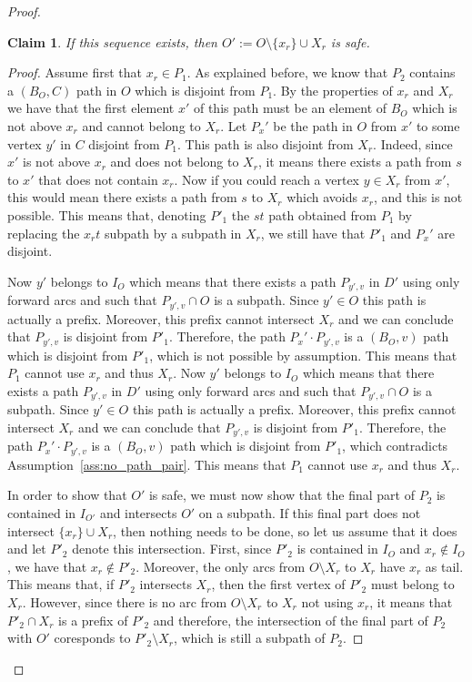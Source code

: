 \documentclass[utf8,11pt]{article}
\theoremstyle{plain}
\newtheorem{claim}{Claim}[theorem]
\theoremstyle{definition}
\begin{document}
\begin{proof}
    \begin{claim}
        If this sequence exists, then $O' := O \setminus \{x_r\} \cup X_r$ is safe. 
    \end{claim}

    \begin{proof}   
   Assume first that $x_r \in P_1$. As explained before, we know that $P_2$ contains a $(B_O, C)$ path in $O$ which is disjoint from $P_1$. By the properties of $x_r$ and $X_r$ we have that the first element $x'$ of this path must be an element of $B_O$ which is not above $x_r$ and cannot belong to $X_r$. Let $P_x'$ be the path in $O$ from $x'$ to some vertex $y'$ in $C$ disjoint from $P_1$. This path is also disjoint from $X_r$. Indeed, since $x'$ is not above $x_r$ and does not belong to $X_r$, it means there exists a path from $s$ to $x'$ that does not contain $x_{r}$. Now if you could reach a vertex $y \in X_r$ from $x'$, this would mean there exists a path from $s$ to $X_r$ which avoids $x_r$, and this is not possible. This means that, denoting $P'_1$ the $st$ path obtained from $P_1$ by replacing the $x_rt$ subpath by a subpath in $X_r$, we still have that $P'_1$ and $P_x'$ are disjoint. 
   
   
   Now $y'$ belongs to $I_O$ which means that there exists a path $P_{y',v}$ in $D'$ using only forward arcs and such that $P_{y',v} \cap O$ is a subpath. Since $y' \in O$ this path is actually a prefix. Moreover, this prefix cannot intersect $X_r$ and we can conclude that $P_{y',v}$ is disjoint from $P'_1$. Therefore, the path $P_x' \cdot P_{y',v}$ is a $(B_O,v)$ path which is disjoint from $P'_1$, which is not possible by assumption. This means that $P_1$ cannot use $x_r$ and thus $X_r$.
   Now $y'$ belongs to $I_O$ which means that there exists a path $P_{y',v}$ in $D'$ using only forward arcs and such that $P_{y',v} \cap O$ is a subpath. Since $y' \in O$ this path is actually a prefix. Moreover, this prefix cannot intersect $X_r$ and we can conclude that $P_{y',v}$ is disjoint from $P'_1$. Therefore, the path $P_x' \cdot P_{y',v}$ is a $(B_O,v)$ path which is disjoint from $P'_1$, which contradicts Assumption~\ref{ass:no_path_pair}. This means that $P_1$ cannot use $x_r$ and thus $X_r$.

   In order to show that $O'$ is safe, we must now show that the final part of $P_2$ is contained in $I_{O'}$ and intersects $O'$ on a subpath. If this final part does not intersect $\{x_r\} \cup X_r$, then nothing needs to be done, so let us assume that it does and let $P'_2$ denote this intersection. First, since $P'_2$ is contained in $I_O$ and $x_r \not \in I_O$, we have that $x_r \not \in P'_2$. Moreover, the only arcs from $O \setminus X_r$ to $X_r$ have $x_r$ as tail. This means that, if $P'_2$ intersects $X_r$, then the first vertex of $P'_2$ must belong to $X_r$. However, since there is no arc from $O \setminus X_r$ to $X_r$ not using $x_r$, it means that $P'_2 \cap X_r$ is a prefix of $P'_2$ and therefore, the intersection of the final part of $P_2$ with $O'$ coresponds to $P'_2 \setminus X_r$, which is still a subpath of $P_2$. 
\end{proof}


\end{proof}
\end{document}
